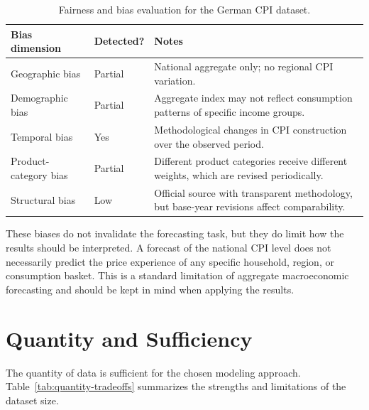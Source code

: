 \begin{table}[htbp]
	\centering
	\caption{Fairness and bias evaluation for the German CPI dataset.}
	\label{tab:fairness-bias-cpi}
	\begin{tabular}{llp{6.5cm}}
		\hline
		\textbf{Bias dimension} & \textbf{Detected?} & \textbf{Notes} \\
		\hline
		Geographic bias & Partial & National aggregate only; no regional CPI variation. \\
		Demographic bias & Partial & Aggregate index may not reflect consumption patterns of specific income groups. \\
		Temporal bias & Yes & Methodological changes in CPI construction over the observed period. \\
		Product-category bias & Partial & Different product categories receive different weights, which are revised periodically. \\
		Structural bias & Low & Official source with transparent methodology, but base-year revisions affect comparability. \\
		\hline
	\end{tabular}
\end{table}

These biases do not invalidate the forecasting task, but they do limit how the results should be interpreted. A forecast of the national CPI level does not necessarily predict the price experience of any specific household, region, or consumption basket. This is a standard limitation of aggregate macroeconomic forecasting and should be kept in mind when applying the results.

\section{Quantity and Sufficiency}

The quantity of data is sufficient for the chosen modeling approach. Table~\ref{tab:quantity-tradeoffs} summarizes the strengths and limitations of the dataset size.

